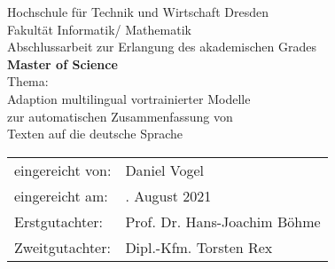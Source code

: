 \begin{titlepage}

\begin{center}
\large{Hochschule für Technik und Wirtschaft Dresden} \\[1ex]
\large{Fakultät Informatik/ Mathematik} \\[15ex]
\Large{Abschlussarbeit zur Erlangung des akademischen Grades} \\[3ex]
\LARGE{\textbf{Master of Science}} \\[10ex]
\Large{Thema:} \\[1ex]
\Large{Adaption multilingual vortrainierter Modelle} \\[1ex]
\Large{zur automatischen Zusammenfassung von} \\[1ex]
\Large{Texten auf die deutsche Sprache} \\[15ex]
\end{center}

\begin{flushleft}
\begin{tabular}{ll}
eingereicht von: & \quad Daniel Vogel \\[2ex]
eingereicht am: & \quad 13. August 2021 \\[2ex]
Erstgutachter:  & \quad Prof. Dr. Hans-Joachim Böhme \\[2ex]
Zweitgutachter: & \quad Dipl.-Kfm. Torsten Rex \\[2ex]
\end{tabular}
\end{flushleft}

\end{titlepage}
